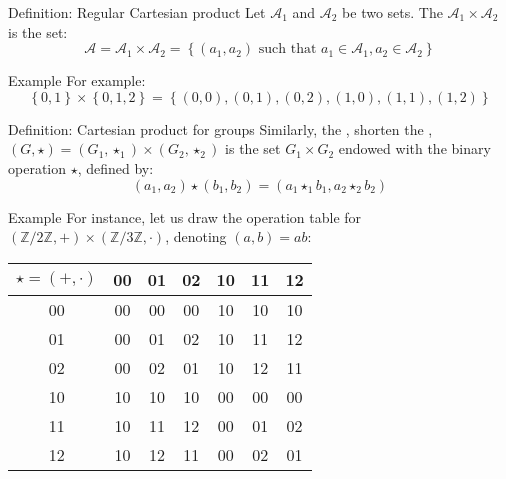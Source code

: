 \documentclass[a4paper]{article}
\begin{document}
\begin{parag}{Definition: Regular Cartesian product}
    Let $\mathcal{A}_1$ and $\mathcal{A}_2$ be two sets. The  $\mathcal{A}_1 \times \mathcal{A}_2$ is the set: 
    \[\mathcal{A} = \mathcal{A}_1 \times \mathcal{A}_2 = \left\{\left(a_1, a_2\right) \text{ such that } a_1 \in \mathcal{A}_1, a_2 \in \mathcal{A}_2\right\}\]

    \begin{subparag}{Example}
        For example:
        \[\left\{0, 1\right\} \times \left\{0, 1, 2\right\} = \left\{\left(0, 0\right), \left(0, 1\right), \left(0, 2\right), \left(1, 0\right), \left(1, 1\right), \left(1, 2\right)\right\}\]
    \end{subparag}
\end{parag}

\begin{parag}{Definition: Cartesian product for groups}
    Similarly, the , shorten the , $\left(G, \star\right) = \left(G_1, \star_1\right)\times \left(G_2, \star_2\right)$ is the set $G_1 \times G_2$ endowed with the binary operation $\star$, defined by: 
    \[\left(a_1, a_2\right) \star \left(b_1, b_2\right) = \left(a_1 \star_1 b_1, a_2 \star_2 b_2\right)\]

    \begin{subparag}{Example}
        For instance, let us draw the operation table for $\left(\mathbb{Z} / 2\mathbb{Z}, +\right) \times \left(\mathbb{Z} / 3\mathbb{Z}, \cdot\right)$, denoting $\left(a, b\right)= ab$:

        \begin{center}
        \begin{tabular}{c|cccccc}
            $\star = \left(+, \cdot\right)$ & 00 & 01 & 02 & 10 & 11 & 12 \\
            \hline
            00 & 00 & 00 & 00 & 10 & 10 & 10 \\
            01 & 00 & 01 & 02 & 10 & 11 & 12 \\
            02 & 00 & 02 & 01 & 10 & 12 & 11 \\
            10 & 10 & 10 & 10 & 00 & 00 & 00 \\
            11 & 10 & 11 & 12 & 00 & 01 & 02 \\
            12 & 10 & 12 & 11 & 00 & 02 & 01
        \end{tabular}
        \end{center}
    \end{subparag}
\end{parag}
\end{document}
